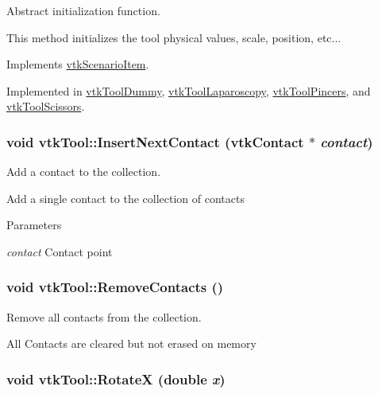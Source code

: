 Abstract initialization function. 

This method initializes the tool physical values, scale, position, etc... 

Implements \hyperlink{classvtkScenarioItem_a87f01894de62f23433aa2eb3f995c216}{vtkScenarioItem}.



Implemented in \hyperlink{classvtkToolDummy_aaf4c69a9c0fc3432e678ca9fffc913dc}{vtkToolDummy}, \hyperlink{classvtkToolLaparoscopy_ace75ea21a3ddb27547976ddea0ebb60e}{vtkToolLaparoscopy}, \hyperlink{classvtkToolPincers_ae4918610073324c94dddd8da234742a9}{vtkToolPincers}, and \hyperlink{classvtkToolScissors_a5fc5884ce0fd1723ecf86888bdbba7a6}{vtkToolScissors}.

\hypertarget{classvtkTool_ae32bfdeb6ede9c25b0956fad8c15ba98}{
\subsubsection[{InsertNextContact}]{\setlength{\rightskip}{0pt plus 5cm}void vtkTool::InsertNextContact ({\bf vtkContact} $\ast$ {\em contact})}}
\label{classvtkTool_ae32bfdeb6ede9c25b0956fad8c15ba98}


Add a contact to the collection. 

Add a single contact to the collection of contacts 
\begin{DoxyParams}{Parameters}
\item[{\em contact}]Contact point \end{DoxyParams}
\hypertarget{classvtkTool_a387cd53a14d1d40035f63a255eb57165}{
\subsubsection[{RemoveContacts}]{\setlength{\rightskip}{0pt plus 5cm}void vtkTool::RemoveContacts ()}}
\label{classvtkTool_a387cd53a14d1d40035f63a255eb57165}


Remove all contacts from the collection. 

All Contacts are cleared but not erased on memory \hypertarget{classvtkTool_a34b408444b681853b5dabbda6b971223}{
\subsubsection[{RotateX}]{\setlength{\rightskip}{0pt plus 5cm}void vtkTool::RotateX (double {\em x})}}
\label{classvtkTool_a34b408444b681853b5dabbda6b971223}


